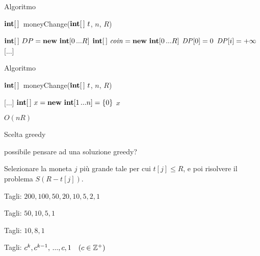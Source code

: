 \begin{frame}{Algoritmo}

\vspace{-12pt}
\begin{Procedure}
\caption[A]{$\INTARRAY$\ \textsf{moneyChange}($\INTARRAY\ t$, \INTEGER $n$, \INTEGER $R$)}
$\INTEGER[\,]\ DP = \NEW\ \INTEGER[0 \mydots R]$
$\INTEGER[\,]\ \mathit{coin} = \NEW\ \INTEGER[0 \mydots R]$
$\DP[0] = 0$\;
 {
  $\DP[i] = +\infty$\;
   {
  }
}
[...]
\end{Procedure}

\end{frame}


\begin{frame}{Algoritmo}

\vspace{-12pt}
\begin{Procedure}
\caption[A]{$\INTARRAY$\ \textsf{moneyChange}($\INTARRAY\ t$, \INTEGER $n$, \INTEGER $R$)}
[...]\;
$\INTARRAY\ x = \NEW\ \INTEGER[1 \mydots n] = \{ 0 \}$
\Return $x$\;
\end{Procedure}

\pause \alert{$O(nR)$}

\end{frame}




\begin{frame}{Scelta greedy}

\vspace{-6pt}
\begin{myboxtitle}[Domanda]
\EE possibile pensare ad una soluzione greedy?
\end{myboxtitle}

\pause
\begin{myboxtitle}[Risposta]
Selezionare la moneta $j$ più grande tale per cui $t[j] \leq R$, e poi risolvere 
il problema $S(R-t[j])$.
\end{myboxtitle}

\pause
\begin{myboxtitle}[Esempi]
\BIL
\item Tagli: $200, 100, 50, 20, 10, 5, 2, 1$
\item Tagli: $50, 10, 5, 1$
\item Tagli: $10, 8, 1$
\item Tagli: $c^k, c^{k-1}, \mydots, c, 1 \quad (c \in \mathbb{Z^+})$
\EIL
\end{myboxtitle}


\end{frame}

